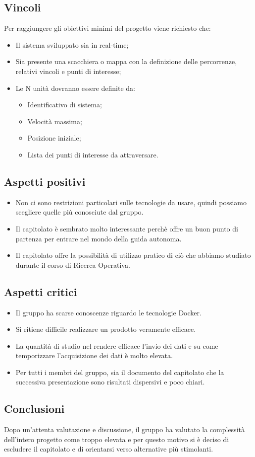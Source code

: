 \subsection{Vincoli}
Per raggiungere gli obiettivi minimi del progetto viene richiesto che:
\begin{itemize}
\item Il sistema sviluppato sia in real-time;
\item Sia presente una scacchiera o mappa con la definizione delle percorrenze, relativi vincoli e punti di interesse;
\item Le N unità dovranno essere definite da:
	\begin{itemize}
	\item Identificativo di sistema;
	\item Velocità massima;
	\item Posizione iniziale;
	\item Lista dei punti di interesse da attraversare.
	\end{itemize}
\end{itemize}

\subsection{Aspetti positivi}
\begin{itemize}
	\item Non ci sono restrizioni particolari sulle tecnologie da usare, quindi possiamo scegliere quelle più conosciute dal gruppo.
	\item Il capitolato è sembrato molto interessante perchè offre un buon punto di partenza per entrare nel mondo della guida autonoma.
	\item Il capitolato offre la possibilità di utilizzo pratico di ciò che abbiamo studiato durante il corso di Ricerca Operativa.
\end{itemize}

\subsection{Aspetti critici}
\begin{itemize}
	\item Il gruppo ha scarse conoscenze riguardo le tecnologie Docker.
	\item Si ritiene difficile realizzare un prodotto veramente efficace.
	\item La quantità di studio nel rendere efficace l'invio dei dati e su come temporizzare l'acquisizione dei dati è molto elevata.
	\item Per tutti i membri del gruppo, sia il documento del capitolato che la successiva presentazione sono risultati dispersivi e poco chiari. 
\end{itemize}

\subsection{Conclusioni}
Dopo un'attenta valutazione e discussione, il gruppo ha valutato la complessità dell'intero progetto come troppo elevata e per questo motivo si è deciso di escludere il capitolato e di orientarsi verso alternative più stimolanti.
